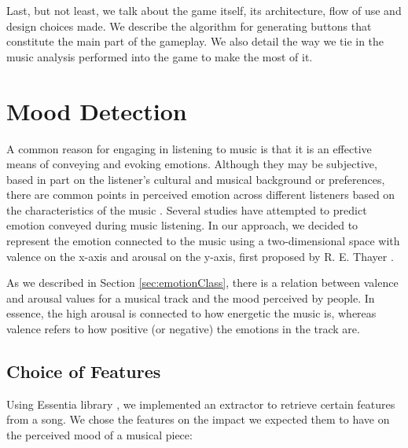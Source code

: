 Last, but not least, we talk about the game itself, its architecture, flow of use and design choices made. We describe the algorithm for generating buttons that constitute the main part of the gameplay. We also detail the way we tie in the music analysis performed into the game to make the most of it.

\vspace{20pt}

\section{Mood Detection}
\vspace{10pt}

A common reason for engaging in listening to music is that it is an effective means of conveying and evoking emotions. Although they may be subjective, based in part on the listener’s cultural and musical background or preferences, there are common points in perceived emotion across different listeners based on the characteristics of the music \cite{vempala}. Several studies have attempted to predict emotion conveyed during music listening. In our approach, we decided to represent the emotion connected to the music using a two-dimensional space with valence on the x-axis and arousal on the y-axis, first proposed by R. E. Thayer \cite{Thayer}.

As we described in Section \ref{sec:emotionClass}, there is a relation between valence and arousal values for a musical track and the mood perceived by people. In essence, the high arousal is connected to how energetic the music is, whereas valence refers to how positive (or negative) the emotions in the track are. 

\vspace{10pt}

\subsection{Choice of Features}
Using Essentia library \cite{essentia}, we implemented an extractor to retrieve certain features from a song. We chose the features on the impact we expected them to have on the perceived mood of a musical piece:

